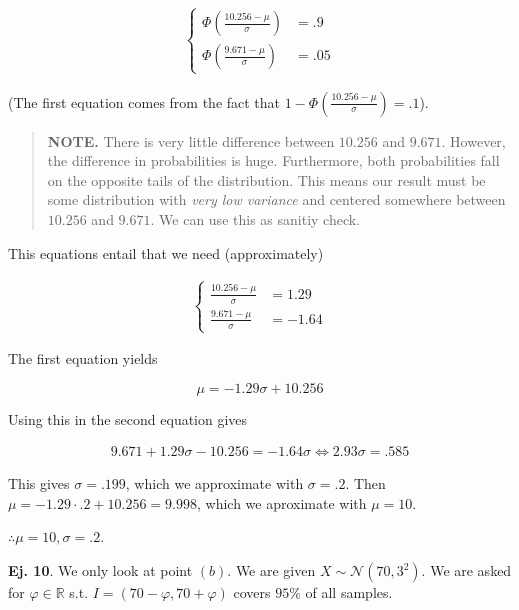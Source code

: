 \documentclass[a4paper, 12pt]{article}
\begin{document}
\begin{align*}
    \begin{cases}
        \Phi(\frac{ 10.256 - \mu }{\sigma}) &= .9 \\ 
        \Phi(\frac{9.671 - \mu}{\sigma}) &= .05
    \end{cases}
\end{align*}


(The first equation comes from the fact that $1 - \Phi(\frac{10.256  - \mu}{\sigma}) = .1$).


\small
\begin{quote}

\textbf{NOTE.} There is very little difference between $10.256$ and $9.671$. However,
the difference in probabilities is huge. Furthermore, both probabilities 
fall on the opposite tails of the distribution. This means our result must be
some distribution with \textit{very low variance} and centered somewhere
between $10.256$ and $9.671$. We can use this as sanitiy check.
\end{quote}
\normalsize


This equations entail that we need (approximately)

\begin{align*}
    \begin{cases}
        \frac{10.256 - \mu}{\sigma} &= 1.29 \\
            \frac{9.671 - \mu}{\sigma} &= -1.64
    \end{cases}
\end{align*}

The first equation yields 

\begin{equation*}
    \mu = -1.29\sigma + 10.256
\end{equation*}

Using this in the second equation gives 

\begin{align*}
    9.671 + 1.29\sigma - 10.256 = -1.64\sigma \iff 2.93\sigma = .585
\end{align*}

This gives $\sigma = .199$, which we approximate with $\sigma = .2$. Then 
$\mu = -1.29\cdot .2 + 10.256 = 9.998$, which we aproximate with 
$\mu = 10$.

$\therefore \mu = 10, \sigma = .2$.

\pagebreak 

\textbf{Ej. 10}. We only look at point $(b)$. We are given $X \sim \mathcal{N}(70, 3^2)$.
We are asked for $\varphi \in \mathbb{R}$ s.t. $I = (70 - \varphi, 70 + \varphi)$
covers $95\%$ of all samples.
\end{document}
